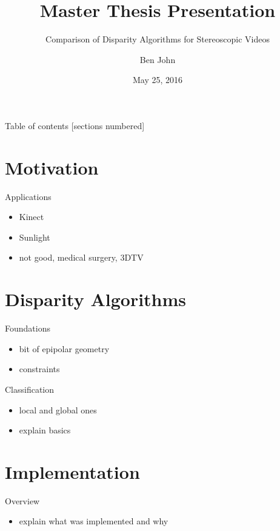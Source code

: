 \documentclass[10pt]{beamer}
\title{Master Thesis Presentation}
\subtitle{Comparison of Disparity Algorithms for Stereoscopic Videos}
\date{May 25, 2016}
\author{Ben John}
\institute{University of Mannheim, }
\begin{document}
\maketitle

\begin{frame}{Table of contents}
  [sections numbered]
  \tableofcontents[hideallsubsections]
\end{frame}

\section{Motivation}

\begin{frame}[fragile]{Applications}
  \begin{itemize}
    \item Kinect
    \item Sunlight
    \item not good, medical surgery, 3DTV
  \end{itemize}
\end{frame}

\section{Disparity Algorithms}

\begin{frame}[fragile]{Foundations}
  \begin{itemize}
    \item bit of epipolar geometry
    \item constraints
  \end{itemize}
\end{frame}

\begin{frame}[fragile]{Classification}
  \begin{itemize}
    \item local and global ones
    \item explain basics
  \end{itemize}
\end{frame}

\section{Implementation}

\begin{frame}[fragile]{Overview}
  \begin{itemize}
    \item explain what was implemented and why
  \end{itemize}
\end{frame}
\end{document}
